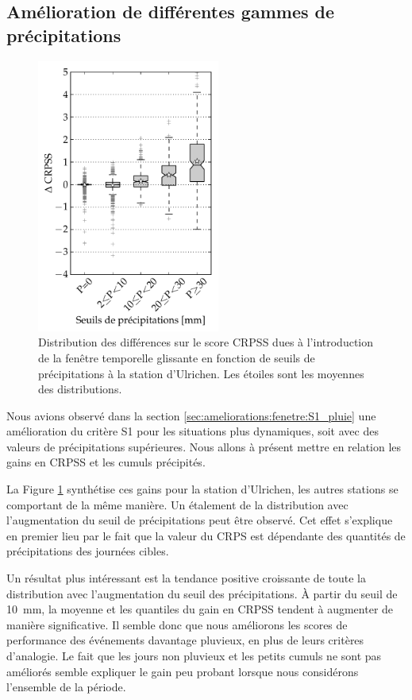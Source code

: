 \documentclass[hess]{copernicus}
\begin{document}
\subsection{Amélioration de différentes gammes de précipitations}
\label{sec:ameliorations:fenetre:gammes_precip}

\begin{figure}[htb]
	\includegraphics[width=6cm]{figures/Graphique_fenetre_glissante_chmts_CRPS_seuils_precip.pdf}
	\caption{Distribution des différences sur le score CRPSS dues à l'introduction de la fenêtre temporelle glissante en fonction de seuils de précipitations à la station d'Ulrichen. Les étoiles sont les moyennes des distributions.}
	\label{fig:Graphique_fenetre_glissante_chmts_CRPS_seuils_precip}
\end{figure}

Nous avions observé dans la section \ref{sec:ameliorations:fenetre:S1_pluie} une amélioration du critère S1 pour les situations plus dynamiques, soit avec des valeurs de précipitations supérieures. Nous allons à présent mettre en relation les gains en CRPSS et les cumuls précipités.

La Figure \ref{fig:Graphique_fenetre_glissante_chmts_CRPS_seuils_precip} synthétise ces gains pour la station d'Ulrichen, les autres stations se comportant de la même manière. Un étalement de la distribution avec l'augmentation du seuil de précipitations peut être observé. Cet effet s'explique en premier lieu par le fait que la valeur du CRPS est dépendante des quantités de précipitations des journées cibles. 

Un résultat plus intéressant est la tendance positive croissante de toute la distribution avec l'augmentation du seuil des précipitations. À partir du seuil de 10~mm, la moyenne et les quantiles du gain en CRPSS tendent à augmenter de manière significative. Il semble donc que nous améliorons les scores de performance des événements davantage pluvieux, en plus de leurs critères d'analogie. Le fait que les jours non pluvieux et les petits cumuls ne sont pas améliorés semble expliquer le gain peu probant lorsque nous considérons l'ensemble de la période.
\end{document}
